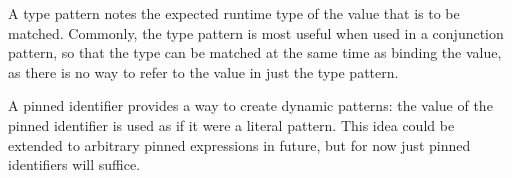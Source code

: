 A type pattern notes the expected runtime type of the value that is to be matched.
Commonly, the type pattern is most useful when used in a conjunction pattern, so
that the type can be matched at the same time as binding the value, as there is no
way to refer to the value in just the type pattern.

\begin{bnf*}
\end{bnf*}

\begin{prooftree}
\end{prooftree}

A pinned identifier provides a way to create dynamic patterns: the value of the
pinned identifier is used as if it were a literal pattern. This idea could be
extended to arbitrary pinned expressions in future, but for now just pinned
identifiers will suffice.

\begin{bnf*}
\end{bnf*}

\begin{prooftree}
\end{prooftree}
